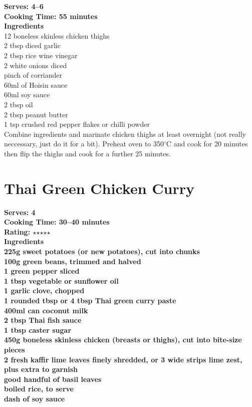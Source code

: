 \documentclass[18pt, oneside]{book}
\newcommand{\mystar}{{\fontfamily{lmr}\selectfont$\star$}}
\begin{document}
\textbf{Serves: 4--6} \\
\textbf{Cooking Time: 55 minutes} \\ 

\textbf{Ingredients}\\ 
12 boneless skinless chicken thighs \\
2 tbsp diced garlic \\
2 tbsp rice wine vinegar \\
2 white onions diced \\
pinch of corriander \\
60ml of Hoisin sauce \\
60ml soy sauce \\
2 tbsp oil \\
2 tbsp peanut butter \\
1 tsp crushed red pepper flakes or chilli powder \\

Combine ingredients and marinate chicken thighs at least overnight (not really neccessary, just do it for a bit). Preheat oven to 350$^{\circ}$C and cook for 20 minutes then flip the thighs and cook for a further 25 minutes. 

\section{Thai Green Chicken Curry}

\bf{Serves: 4} \\
\bf{Cooking Time: 30--40 minutes} \\ 
\bf{Rating: \mystar  \mystar  \mystar  \mystar  \mystar} \\ 

\bf{Ingredients} \normalfont \\ 
225g sweet potatoes (or new potatoes), cut into chunks \\
100g green beans, trimmed and halved \\
1 green pepper sliced \\
1 tbsp vegetable or sunflower oil \\
1 garlic clove, chopped \\
1 rounded tbsp or 4 tbsp Thai green curry paste \\
400ml can coconut milk \\
2 tbsp Thai fish sauce \\
1 tbsp caster sugar \\
450g boneless skinless chicken (breasts or thighs), cut into bite-size pieces \\
2 fresh kaffir lime leaves finely shredded, or 3 wide strips lime zest, plus extra to garnish \\
good handful of basil leaves \\
boiled rice, to serve \\
dash of soy sauce \\
\end{document}
